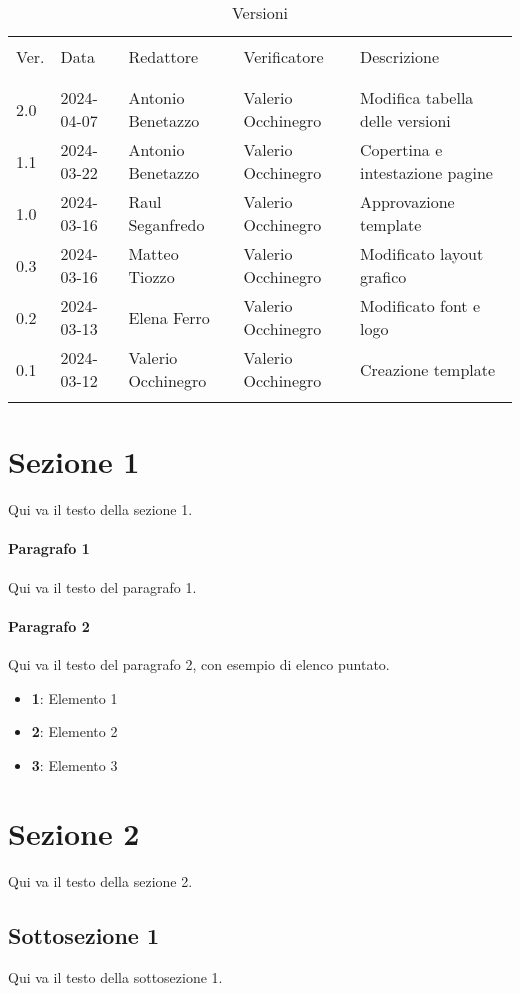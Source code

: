 \documentclass[italian,12pt]{article}
\begin{document}


\newpage



\begin{table}[!h]
	\caption{Versioni}
	\footnotesize
	\begin{center}
		\begin{tabular}{ l l l l l }
			\hline                                                                                        \\[-2ex]
			Ver. & Data       & Redattore          & Verificatore       & Descrizione                     \\
			\\[-2ex] \hline \\[-1.5ex]
			2.0  & 2024-04-07 & Antonio Benetazzo  & Valerio Occhinegro & Modifica tabella delle versioni \\
			1.1  & 2024-03-22 & Antonio Benetazzo  & Valerio Occhinegro & Copertina e intestazione pagine \\
			1.0  & 2024-03-16 & Raul Seganfredo    & Valerio Occhinegro & Approvazione template           \\
			0.3  & 2024-03-16 & Matteo Tiozzo      & Valerio Occhinegro & Modificato layout grafico       \\
			0.2  & 2024-03-13 & Elena Ferro        & Valerio Occhinegro & Modificato font e logo          \\
			0.1  & 2024-03-12 & Valerio Occhinegro & Valerio Occhinegro & Creazione template              \\
			\\[-1.5ex] \hline
		\end{tabular}
	\end{center}
\end{table}

\newpage

\tableofcontents

\newpage

\section{Sezione 1}
Qui va il testo della sezione 1.

\paragraph{Paragrafo 1}
Qui va il testo del paragrafo 1.

\paragraph{Paragrafo 2}
Qui va il testo del paragrafo 2, con esempio di elenco puntato.
\begin{itemize}
	\itemsep0em
	\item \textbf{1}: Elemento 1
	\item \textbf{2}: Elemento 2
	\item \textbf{3}: Elemento 3
\end{itemize}



\section{Sezione 2}
Qui va il testo della sezione 2.
\subsection{Sottosezione 1}
Qui va il testo della sottosezione 1.
\end{document}
